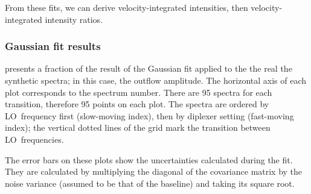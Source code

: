 From these fits, we can derive velocity-integrated intensities, then velocity-integrated intensity ratios.

\subsubsection{Gaussian fit results}

 presents a fraction of the result of the Gaussian fit applied to the the real the synthetic spectra; in this case, the  outflow amplitude.
The horizontal axis of each plot corresponds to the spectrum number.
There are 95 spectra for each transition, therefore 95 points on each plot.
The spectra are ordered by LO~frequency first (slow-moving index), then by diplexer setting (fast-moving index); the vertical dotted lines of the grid mark the transition between LO~frequencies.

The error bars on these plots show the uncertainties calculated during the fit.
They are calculated by multiplying the diagonal of the covariance matrix by the noise variance (assumed to be that of the baseline) and taking its square root.

